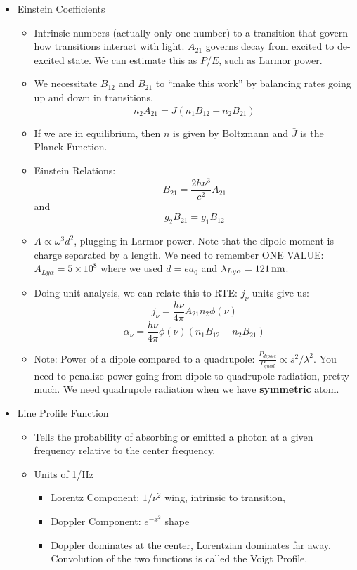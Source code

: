 \documentclass{article}
\newcommand{\unit}[1]{{\,\rm #1}}
\newcommand{\nm}{\unit{nm}}
\def\ato{{A_{21}}}
\def\bto{{B_{21}}}
\def\bot{{B_{12}}}
\def\ato{{A_{21}}}
\def\bto{{B_{21}}}
\def\bot{{B_{12}}}
\def\ato{{A_{21}}}
\def\bto{{B_{21}}}
\def\bot{{B_{12}}}
\begin{document}
\begin{itemize}
    \item Einstein Coefficients
    \begin{itemize}
        \item Intrinsic numbers (actually only one number) to a transition that govern how transitions interact with light. $\ato$ governs decay from excited to de-excited state. We can estimate this as $P/E$, such as Larmor power. 
        \item We necessitate $\bot$ and $\bto$ to ``make this work'' by balancing rates going up and down in transitions. 
        $$
        n_{2} A_{21} = \bar{J}\left(n_1 B_{12} - n_2 B_{21}\right)
        $$
        \item If we are in equilibrium, then $n$ is given by Boltzmann and $\bar{J}$ is the Planck Function.
        \item Einstein Relations:
        $$
        B_{21} = \frac{2h\nu^3}{c^2}A_{21}
        $$
        and
        $$
        g_2 B_{21} = g_{1} B_{12}
        $$
        \item $A \propto \omega^3 d^2$, plugging in Larmor power. Note that the dipole moment is charge separated by a length. We need to remember ONE VALUE: $A_{Ly\alpha} = 5 \times 10^{8}$ where we used $d = e a_0$ and $\lambda_{Ly\alpha} = 121 \nm$.
        \item Doing unit analysis, we can relate this to RTE: $j_\nu$ units give us:
        $$
        j_\nu = \frac{h\nu}{4\pi} A_{21} n_2 \phi(\nu)
        $$
        $$
        \alpha_\nu = \frac{h\nu}{4\pi}  \phi(\nu) \left(n_1 B_{12} - n_2 B_{21}\right)
        $$
        \item Note: Power of a dipole compared to a quadrupole: $\frac{P_{dipole}}{P_{quad}} \propto s^2/\lambda^2$. You need to penalize power going from dipole to quadrupole radiation, pretty much. We need quadrupole radiation when we have \textbf{symmetric} atom. 
    \end{itemize}
    
    \item Line Profile Function
    \begin{itemize}
        \item Tells the probability of absorbing or emitted a photon at a given frequency relative to the center frequency. 
        \item Units of 1/Hz
        \begin{itemize}
            \item Lorentz Component: $1/\nu^2$ wing, intrinsic to transition, 
            \item Doppler Component: $e^{-x^2}$ shape
            \item Doppler dominates at the center, Lorentzian dominates far away. Convolution of the two functions is called the Voigt Profile. 
        \end{itemize}
    \end{itemize}
    

\end{itemize}
\end{document}
